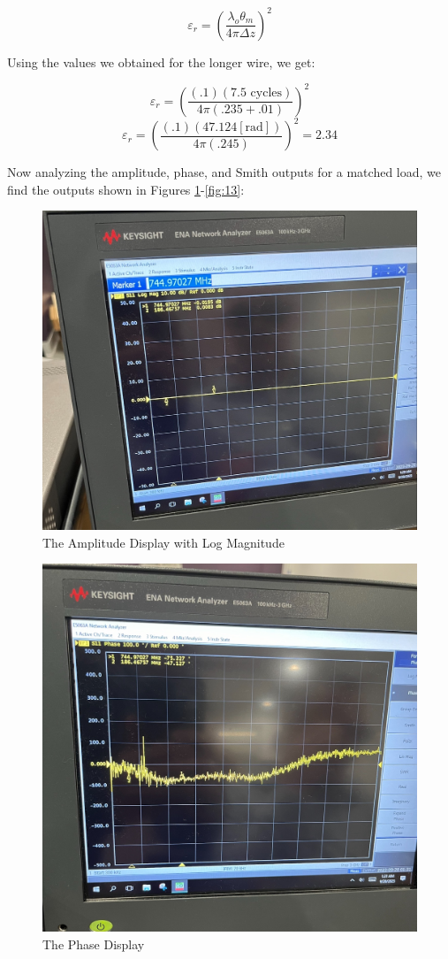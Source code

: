 \documentclass[
	letterpaper, %
	10pt, %
]{CSUniSchoolLabReport}
\begin{document}
$$\varepsilon_r=\left( \frac{\lambda_o\theta_m}{4\pi\Delta z} \right)^2$$

Using the values we obtained for the longer wire, we get:

  $$\varepsilon_r=\left(\frac{(.1)(7.5\text{ cycles})}{4\pi(.235 + .01)}\right)^2$$
  $$\varepsilon_r=\left(\frac{(.1)(47.124[\text{rad}])}{4\pi(.245)}\right)^2=2.34$$

  Now analyzing the amplitude, phase, and Smith outputs for a matched load, we find the outputs shown in Figures \ref{fig:11}-\ref{fig:13}:

  \begin{figure}[H]
    \centering
    \includegraphics[width=.75\textwidth]{Figures/Lab One/Amp.png}
    \caption{The Amplitude Display with Log Magnitude}
    \label{fig:11}
  \end{figure}

  \begin{figure}[H]
    \centering
    \includegraphics[width=.75\textwidth]{Figures/Lab One/Phase.png}
    \caption{The Phase Display}
    \label{fig:12}
  \end{figure}
\end{document}
